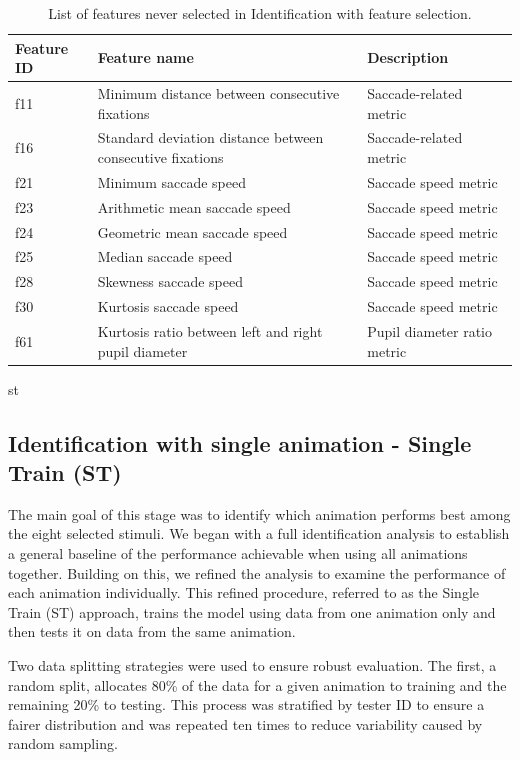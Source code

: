 \documentclass[12pt]{report}
\begin{document}
\begin{table}[H]
\centering
\small
\setlength{\tabcolsep}{4pt} %
\caption{List of features never selected in Identification with feature selection.}
\label{tab:ns_id}
\begin{tabular}{lll}
\toprule
\textbf{Feature ID} & \textbf{Feature name} & \textbf{Description} \\
\midrule
f11 & Minimum distance between consecutive fixations & Saccade-related metric \\
f16 & Standard deviation distance between consecutive fixations & Saccade-related metric \\
f21 & Minimum saccade speed & Saccade speed metric \\
f23 & Arithmetic mean saccade speed & Saccade speed metric \\
f24 & Geometric mean saccade speed & Saccade speed metric \\
f25 & Median saccade speed & Saccade speed metric \\
f28 & Skewness saccade speed & Saccade speed metric \\
f30 & Kurtosis saccade speed & Saccade speed metric \\
f61 & Kurtosis ratio between left and right pupil diameter & Pupil diameter ratio metric \\
\bottomrule
\end{tabular}st
\end{table}
\FloatBarrier


\subsection{Identification with single animation - Single Train (ST)}
\label{subsec:id_s_st}

The main goal of this stage was to identify which animation performs best among the eight selected stimuli. 
We began with a full identification analysis to establish a general baseline of the performance achievable when using all animations together. 
Building on this, we refined the analysis to examine the performance of each animation individually. 
This refined procedure, referred to as the Single Train (ST) approach, trains the model using data from one animation only and then tests it on data from the same animation.

Two data splitting strategies were used to ensure robust evaluation. 
The first, a random split, allocates 80\% of the data for a given animation to training and the remaining 20\% to testing.
This process was stratified by tester ID to ensure a fairer distribution and was repeated ten times to reduce variability caused by random sampling.
\end{document}
